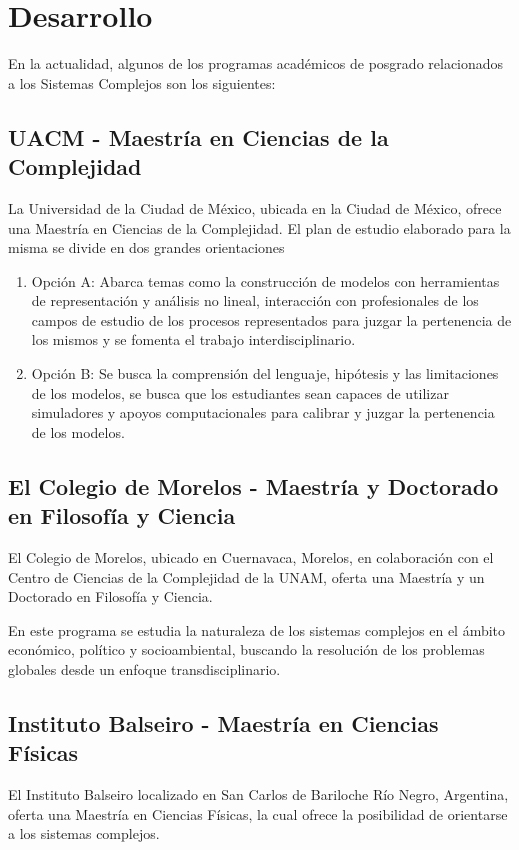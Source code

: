 \section{Desarrollo}
	En la actualidad, algunos de los programas académicos de posgrado relacionados a los Sistemas Complejos son los siguientes:
\subsection{UACM - Maestría en Ciencias de la Complejidad}
	La Universidad de la Ciudad de México, ubicada en la Ciudad de México, ofrece una Maestría en Ciencias de la Complejidad\cite{UACM}. El plan de estudio elaborado para la misma se divide en dos grandes orientaciones
	\begin{enumerate}
		\item Opción A: Abarca temas como la construcción de modelos con herramientas de representación y análisis no lineal, interacción con profesionales de los campos de estudio de los procesos representados para juzgar la pertenencia de los mismos y se fomenta el trabajo interdisciplinario.
		\item Opción B: Se busca la comprensión del lenguaje, hipótesis y las limitaciones de los modelos, se busca que los estudiantes sean capaces de utilizar simuladores y apoyos computacionales para calibrar y juzgar la pertenencia de los modelos.
	\end{enumerate}

\subsection{El Colegio de Morelos - Maestría y Doctorado en Filosofía y Ciencia}
	El Colegio de Morelos, ubicado en Cuernavaca, Morelos, en colaboración con el Centro de Ciencias de la Complejidad de la UNAM, oferta una Maestría y un Doctorado  en Filosofía y Ciencia\cite{MORELOS}.

	En este programa se estudia la naturaleza de los sistemas complejos en el ámbito económico, político y socioambiental, buscando la resolución de los problemas globales desde un enfoque transdisciplinario.

\subsection{Instituto Balseiro - Maestría en Ciencias Físicas}
	El Instituto Balseiro localizado en San Carlos de Bariloche Río Negro, Argentina, oferta una Maestría en Ciencias Físicas, la cual ofrece la posibilidad de orientarse a los sistemas complejos\cite{Balseiro}.

